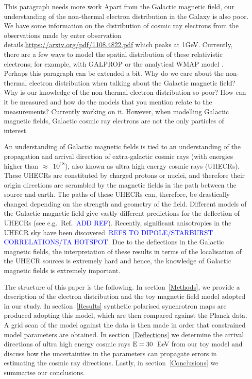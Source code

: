 \documentclass[12pt, a4 paper]{article}
\newcommand{\Arjen}[1]{{\color{brown}#1}}
\newcommand{\Vasu}[1]{{\color{purple}#1}}
\begin{document}
\Vasu{This paragraph needs more work}
Apart from the Galactic magnetic field, our understanding of the non-thermal electron distribution in the Galaxy is also poor. We have some information on the distribution of cosmic ray electrons from the observations made by \Vasu{enter observation details.}\hyperlink{CR spectra}{https://arxiv.org/pdf/1108.4822.pdf} which peaks at 1GeV.
Currently, there are a few ways to model the spatial distribution of these relativistic electrons; for example, with GALPROP \cite{Hammurabi} or the analytical WMAP model \cite{WMAP_Page}. \Arjen{Perhaps this paragraph can be extended a bit. Why do we care about the non-thermal electron distribution when talking about the Galactic magnetic field? Why is our knowledge of the non-thermal electron distribution so poor? How can it be measured and how do the models that you mention relate to the measurements?} \Vasu{Currently working on it.}
However, when modelling Galactic magnetic fields, Galactic cosmic ray electrons are not the only particles of interest. 

An understanding of Galactic magnetic fields is tied to an understanding of the propagation and arrival direction of extra-galactic cosmic rays (with energies higher than $\approx$~$10^{18}$), also known  as ultra high energy cosmic rays (UHECRs). These UHECRs are constituted by charged protons or nuclei, and therefore their origin directions are scrambled by the magnetic fields in the path between the source and earth. The paths of these UHECRs can, therefore, be drastically changed depending on the strength and geometry of the field. Different models of the Galactic magnetic field give vastly different predictions for the deflection of UHECRs (see e.g.~Ref.~\textcolor{blue}{ADD REF}). Recently, significant anisotropies in the UHECR sky have been discovered~\textcolor{blue}{REFS TO DIPOLE/STARBURST CORRELATIONS/TA HOTSPOT}. Due to the deflections in the Galactic magnetic fields, the interpretation of these results in terms of the localisation of the UHECR sources is extremely hard and hence, the knowledge of Galactic magnetic fields is extremely important. 

The structure of this paper is the following. In section~\ref{Methods}, we provide a description of the electron distribution and the toy magnetic field model adopted in our study. In section~\ref{Results} synthetic polarised synchrotron maps are produced adopting this model, which are then compared against the Planck data. A grid scan of the model against the data is then made in order that constrained model parameters are obtained. In section~\ref{Deflections} we determine the arrival directions of ultra high energy cosmic rays $\rm E = 30$~EeV from our toy model and discuss how the uncertainties in the parameters can propagate errors in estimating the cosmic ray directions. %
Lastly, in section~\ref{Conclusions} we summarise our conclusions.
\end{document}
